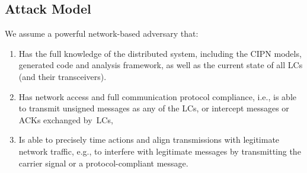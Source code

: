 \subsection{Attack Model}
\label{subsec:attackModel}
We assume %
a powerful network-based adversary that:
\begin{enumerate}
  \item Has the full knowledge of the distributed system, %
  including the CIPN models, generated code and analysis framework, as well as  the current state of all LCs (and their transceivers).
  \item Has network access and full communication protocol compliance, i.e., is able to transmit unsigned messages as any of the LCs, or intercept messages or %
ACKs exchanged by~LCs,
  \item Is able to precisely time actions and align transmissions with legitimate network traffic, e.g., to interfere with legitimate messages by transmitting the carrier signal or a protocol-compliant message.
\end{enumerate}

